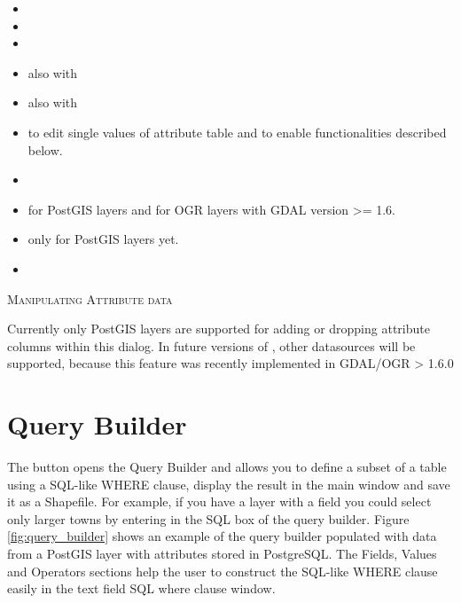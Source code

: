 \begin{itemize}[label=--]
\item {}
\item {}
\item {}
\item {} also with 
\item {} also with 
\item {} to edit single values
of attribute table and to enable functionalities described below.
\item {}
\item {} for PostGIS layers and for OGR layers with GDAL version >= 1.6.
\item {} only for PostGIS layers yet.
\item {}
\end{itemize}

\begin{Tip}\caption{\textsc{Manipulating Attribute data}}
Currently only PostGIS layers are supported for adding or dropping
attribute columns within this dialog. In future versions of \qg, other
datasources will be supported, because this feature was recently implemented
in GDAL/OGR > 1.6.0
\end{Tip}

\section{Query Builder}\label{sec:query_builder}

The  button opens the Query Builder and allows you to
define a subset of a table using a SQL-like WHERE clause, display the result in the
main window and save it as a Shapefile. For example, if you have a
 layer
with a  field you could select only larger towns by entering
 in the SQL box of the query builder. Figure
\ref{fig:query_builder} shows an example of the query builder populated with
data from a PostGIS layer with attributes stored in PostgreSQL.
The Fields, Values and Operators sections help the user to construct the SQL-like
WHERE clause easily in the text field SQL where clause window.


